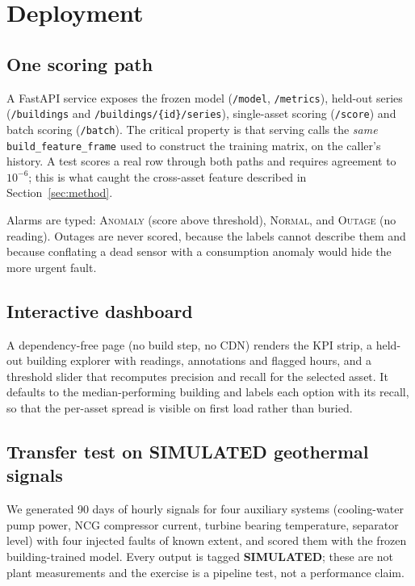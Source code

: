 \documentclass[conference]{IEEEtran}
\newcommand{\simnote}{\textbf{SIMULATED}}
\begin{document}
\section{Deployment}
\label{sec:deploy}

\subsection{One scoring path}

A FastAPI service exposes the frozen model (\texttt{/model}, \texttt{/metrics}), held-out series
(\texttt{/buildings} and \texttt{/buildings/\allowbreak\{id\}/\allowbreak series}), single-asset scoring (\texttt{/score}) and
batch scoring (\texttt{/batch}). The critical property is that serving calls the \emph{same}
\texttt{build\_feature\_frame} used to construct the training matrix, on the caller's history. A test
scores a real row through both paths and requires agreement to $10^{-6}$; this is what caught the
cross-asset feature described in Section~\ref{sec:method}.

Alarms are typed: \textsc{Anomaly} (score above threshold), \textsc{Normal}, and \textsc{Outage} (no
reading). Outages are never scored, because the labels cannot describe them and because conflating a
dead sensor with a consumption anomaly would hide the more urgent fault.

\subsection{Interactive dashboard}

A dependency-free page (no build step, no CDN) renders the KPI strip, a held-out building explorer
with readings, annotations and flagged hours, and a threshold slider that recomputes precision and
recall for the selected asset. It defaults to the median-performing building and labels each option
with its recall, so that the per-asset spread is visible on first load rather than buried.

\subsection{Transfer test on \simnote{} geothermal signals}
\label{sec:transfer}

We generated 90 days of hourly signals for four auxiliary systems (cooling-water pump power, NCG
compressor current, turbine bearing temperature, separator level) with four injected faults of known
extent, and scored them with the frozen building-trained model. Every output is tagged
\textbf{SIMULATED}; these are not plant measurements and the exercise is a pipeline test, not a
performance claim.
\end{document}
